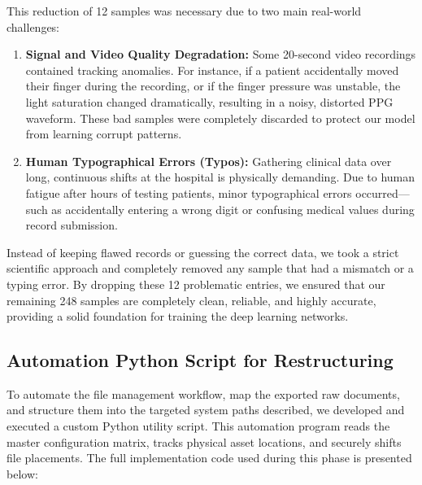 This reduction of 12 samples was necessary due to two main real-world challenges:
\begin{enumerate}
    \item \textbf{Signal and Video Quality Degradation:} Some 20-second video recordings contained tracking anomalies. For instance, if a patient accidentally moved their finger during the recording, or if the finger pressure was unstable, the light saturation changed dramatically, resulting in a noisy, distorted PPG waveform. These bad samples were completely discarded to protect our model from learning corrupt patterns.
    \item \textbf{Human Typographical Errors (Typos):} Gathering clinical data over long, continuous shifts at the hospital is physically demanding. Due to human fatigue after hours of testing patients, minor typographical errors occurred—such as accidentally entering a wrong digit or confusing medical values during record submission. 
\end{enumerate}

Instead of keeping flawed records or guessing the correct data, we took a strict scientific approach and completely removed any sample that had a mismatch or a typing error. By dropping these 12 problematic entries, we ensured that our remaining 248 samples are completely clean, reliable, and highly accurate, providing a solid foundation for training the deep learning networks.

\subsection{Automation Python Script for Restructuring}
To automate the file management workflow, map the exported raw documents, and structure them into the targeted system paths described, we developed and executed a custom Python utility script. This automation program reads the master configuration matrix, tracks physical asset locations, and securely shifts file placements. The full implementation code used during this phase is presented below:

